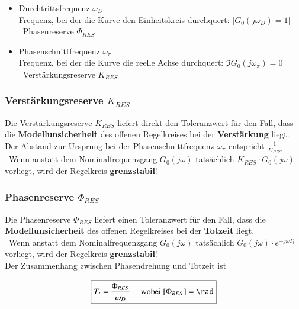 \begin{itemize}
    \item Durchtrittsfrequenz $\omega_{D}$ \\
        Frequenz, bei der die Kurve den Einheitskreis durchquert: $| G_{0}(j \omega_{D}) = 1 |$ \\
        \textrightarrow\ Phasenreserve $\Phi_{RES}$
    
    \item Phasenschnittfrequenz $\omega_{\pi}$ \\
        Frequenz, bei der die Kurve die reelle Achse durchquert: $\Im{G_{0}(j \omega_{\pi})} = 0$\\
        \textrightarrow\ Verstärkungsreserve $K_{RES}$
\end{itemize}


\subsubsection{Verstärkungsreserve $K_{RES}$}

Die Verstärkungsreserve $K_{RES}$ liefert direkt den Toleranzwert für den Fall, dass die \textbf{Modellunsicherheit} des 
offenen Regelkreises bei der \textbf{Verstärkung} liegt. \\
Der Abstand zur Ursprung bei der Phasenschnittfrequenz $\omega_{\pi}$ entspricht $\frac{1}{K_{RES}}$ \\
\textrightarrow\ Wenn anstatt dem Nominalfrequenzgang $G_0(j \omega)$ tatsächlich $K_{RES} \cdot G_0(j \omega)$ vorliegt, wird der
Regelkreis \textbf{grenzstabil}!


\subsubsection{Phasenreserve $\Phi_{RES}$}

Die Phasenreserve $\Phi_{RES}$ liefert einen Toleranzwert für den Fall, dass die \textbf{Modellunsicherheit} des
offenen Regelkreises bei der \textbf{Totzeit} liegt. \\
\textrightarrow\ Wenn anstatt dem Nominalfrequenzgang $G_0(j \omega)$ tatsächlich $G_0(j \omega) \cdot e^{- j \omega T_t}$ vorliegt, 
wird der Regelkreis \textbf{grenzstabil}! \\

Der Zusammenhang zwischen Phasendrehung und Totzeit ist

$$ \boxed{ T_t = \frac{\Phi_{RES}}{\omega_D}  \quad \text{ wobei } [\Phi_{RES}] = \rad } $$


